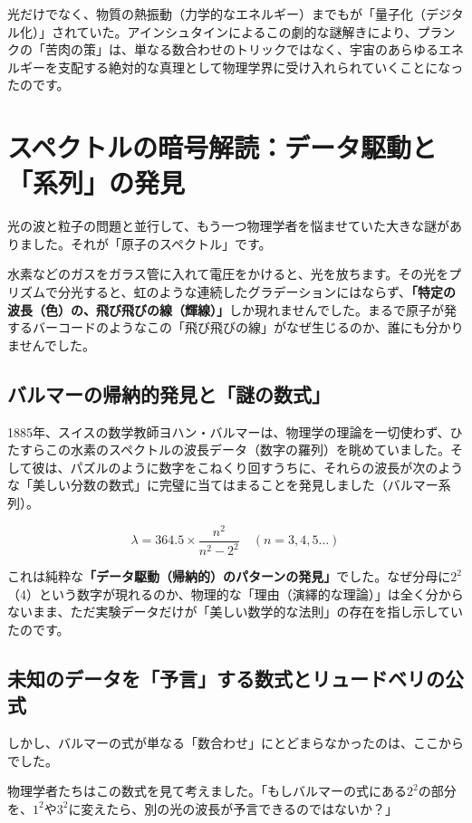 光だけでなく、物質の熱振動（力学的なエネルギー）までもが「量子化（デジタル化）」されていた。アインシュタインによるこの劇的な謎解きにより、プランクの「苦肉の策」は、単なる数合わせのトリックではなく、宇宙のあらゆるエネルギーを支配する絶対的な真理として物理学界に受け入れられていくことになったのです。

\section{スペクトルの暗号解読：データ駆動と「系列」の発見}

光の波と粒子の問題と並行して、もう一つ物理学者を悩ませていた大きな謎がありました。それが「原子のスペクトル」です。

水素などのガスをガラス管に入れて電圧をかけると、光を放ちます。その光をプリズムで分光すると、虹のような連続したグラデーションにはならず、\textbf{「特定の波長（色）の、飛び飛びの線（輝線）」}しか現れませんでした。まるで原子が発するバーコードのようなこの「飛び飛びの線」がなぜ生じるのか、誰にも分かりませんでした。

\subsection{バルマーの帰納的発見と「謎の数式」}

1885年、スイスの数学教師ヨハン・バルマーは、物理学の理論を一切使わず、ひたすらこの水素のスペクトルの波長データ（数字の羅列）を眺めていました。そして彼は、パズルのように数字をこねくり回すうちに、それらの波長が次のような「美しい分数の数式」に完璧に当てはまることを発見しました（バルマー系列）。

\[\lambda = 364.5 \times \frac{n^2}{n^2 - 2^2} \quad (n = 3, 4, 5 \dots)\]

これは純粋な\textbf{「データ駆動（帰納的）のパターンの発見」}でした。なぜ分母に\(2^2\)（4）という数字が現れるのか、物理的な「理由（演繹的な理論）」は全く分からないまま、ただ実験データだけが「美しい数学的な法則」の存在を指し示していたのです。

\subsection{未知のデータを「予言」する数式とリュードベリの公式}

しかし、バルマーの式が単なる「数合わせ」にとどまらなかったのは、ここからでした。

物理学者たちはこの数式を見て考えました。「もしバルマーの式にある\(2^2\)の部分を、\(1^2\)や\(3^2\)に変えたら、別の光の波長が予言できるのではないか？」

